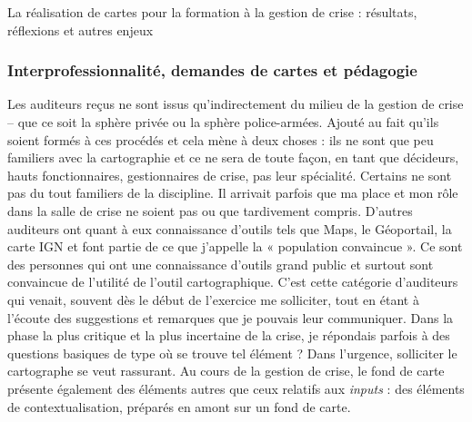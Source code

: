 \documentclass[10pt,a4paper]{report} %
\begin{document}
\begin{part}{La réalisation de cartes pour la formation à la gestion de crise : résultats, réflexions et autres enjeux}
\subsubsection{Interprofessionnalité, demandes de cartes et pédagogie}
Les auditeurs reçus ne sont issus qu’indirectement du milieu de la gestion de crise – que ce soit la sphère privée ou la sphère police-armées. Ajouté au fait qu’ils soient formés à ces procédés et cela mène à deux choses : ils ne sont que peu familiers avec la cartographie et ce ne sera de toute façon, en tant que décideurs, hauts fonctionnaires, gestionnaires de crise, pas leur spécialité. Certains ne sont pas du tout familiers de la discipline. Il arrivait parfois que ma place et mon rôle dans la salle de crise ne soient pas ou que tardivement compris. D’autres auditeurs ont quant à eux connaissance d’outils tels que Maps, le Géoportail, la carte IGN et font partie de ce que j’appelle la « population convaincue ». Ce sont des personnes qui ont une connaissance d’outils grand public et surtout sont convaincue de l’utilité de l’outil cartographique. C’est cette catégorie d’auditeurs qui venait, souvent dès le début de l’exercice me solliciter, tout en étant à l’écoute des suggestions et remarques que je pouvais leur communiquer. Dans la phase la plus critique et la plus incertaine de la crise, je répondais parfois à des questions basiques de type où se trouve tel élément ? Dans l’urgence, solliciter le cartographe se veut rassurant. Au cours de la gestion de crise, le fond de carte présente également des éléments autres que ceux relatifs aux \textit{inputs} : des éléments de contextualisation, préparés en amont sur un fond de carte. 

\end{part}
\end{document}

